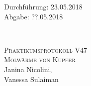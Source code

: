 



\begin{titlepage}
  \begin{flushleft}
 Durchführung: 23.05.2018\\
 Abgabe: ??.05.2018
  \end{flushleft}


\HRule\\[1,0cm]

 \begin{center}


\textsc{\LARGE Praktikumsprotokoll V47}\\[1.5cm]
\textsc{\huge Molwärme von Kupfer} \\[5,5cm]

Janina Nicolini\footnotemark[1], \\
Vanessa Sulaiman\footnotemark[2] \\[1,0cm]



 \end{center}
\HRule

 \vfill

\end{titlepage}






\printbibliography


